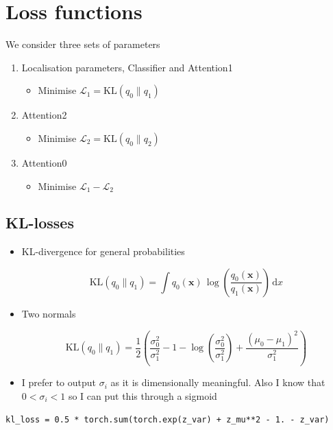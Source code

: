 \documentclass[11pt]{article}
\newcommand{\logg}[1]{\log\!\left( #1 \right)}
\newcommand{\dd}{\mathrm{d}}
\begin{document}
\section{Loss functions}
\label{sec:org9ed8367}
We consider three sets of parameters
\begin{enumerate}
\item Localisation parameters, Classifier and Attention1
\begin{itemize}
\item Minimise \(\mathcal{L}_1 = \mathrm{KL}(q_0\|q_1)\)
\end{itemize}
\item Attention2
\begin{itemize}
\item Minimise \(\mathcal{L}_2 = \mathrm{KL}(q_0\|q_2)\)
\end{itemize}
\item Attention0
\begin{itemize}
\item Minimise \(\mathcal{L}_1 - \mathcal{L}_2\)
\end{itemize}
\end{enumerate}

\subsection{KL-losses}
\label{sec:org877e2ff}
\begin{itemize}
\item KL-divergence  for general probabilities

\[ \mathrm{KL}(q_0\|q_1) = \int q_0(\bm{x}) \,
     \logg{\frac{q_0(\bm{x})}{q_1(\bm{x})}} \, \dd x \]

\item Two normals

\[\mathrm{KL}(q_0\|q_1) = \frac{1}{2} \left(
     \frac{\sigma_0^2}{\sigma_1^2} - 1 -
     \logg{\frac{\sigma_0^2}{\sigma_1^2}} +
     \frac{(\mu_0-\mu_1)^2}{\sigma_1^2} \right) \]

\item I prefer to output \(\sigma_i\) as it is dimensionally meaningful.
Also I know that \(0<\sigma_i<1\) so I can put this through a sigmoid
\end{itemize}




\begin{verbatim}
kl_loss = 0.5 * torch.sum(torch.exp(z_var) + z_mu**2 - 1. - z_var)
\end{verbatim}
\end{document}

